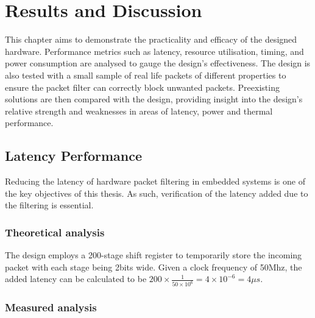 
\chapter[Results]{Results and Discussion}
\label{Chap:label}	%
\pagestyle{headings}

This chapter aims to demonstrate the practicality and efficacy of the designed hardware. Performance metrics such as latency, resource utilisation, timing, and power consumption are analysed to gauge the design's effectiveness. The design is also tested with a small sample of real life packets of different properties to ensure the packet filter can correctly block unwanted packets. Preexisting solutions are then compared with the design, providing insight into the design's relative strength and weaknesses in areas of latency, power and thermal performance.



\section{Latency Performance}

Reducing the latency of hardware packet filtering in embedded systems is one of the key objectives of this thesis. As such, verification of the latency added due to the filtering is essential.

\subsection{Theoretical analysis}
The design employs a 200-stage shift register to temporarily store the incoming packet with each stage being 2bits wide. Given a clock frequency of 50Mhz, the added latency can be calculated to be $200 \times \frac{1}{50\times 10^6} = 4 \times 10^{-6} = 4\mu s$.

\subsection{Measured analysis}


